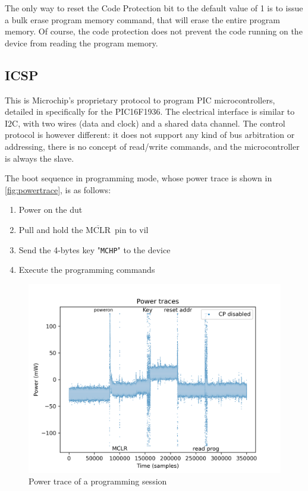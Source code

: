 \documentclass[a4paper,english,twoside,10pt]{article}
\newcommand{\mclr}{\(\overline{\mbox{MCLR}}\)\ }
\begin{document}
The only way to reset the Code Protection bit to the default value of 1 is to issue a bulk erase program memory command, that will erase the entire program memory. Of course, the code protection does not prevent the code running on the device from reading the program memory.

\subsection{ICSP}
This is Microchip's proprietary protocol to program PIC microcontrollers, detailed in \cite{microchip:DS41397B} specifically for the PIC16F1936. The electrical interface is similar to I2C, with two wires (data and clock) and a shared data channel. The control protocol is however different: it does not support any kind of bus arbitration or addressing, there is no concept of read/write commands, and the microcontroller is always the slave.

The boot sequence in programming mode, whose power trace is shown in \autoref{fig:powertrace}, is as follows:
\begin{enumerate}
	\item Power on the \gls{dut}
	\item Pull and hold the \mclr pin to \gls{vil}
	\item Send the 4-bytes key "\texttt{MCHP}" to the device
	\item Execute the programming commands
\end{enumerate}

\begin{figure}[htbp]
	\centering%
	\includegraphics[width=.75\textwidth]{seaborn_power_trace.png}
	\caption{Power trace of a programming session}
	\label{fig:powertrace}
\end{figure}
\end{document}
